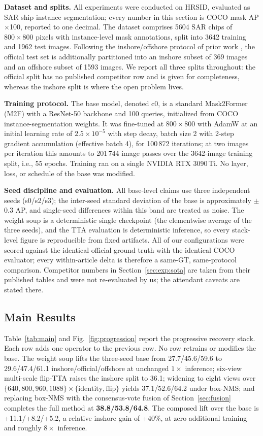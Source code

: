 \textbf{Dataset and splits.} All experiments were conducted on HRSID, evaluated as SAR ship instance segmentation; every number in this section is COCO mask AP $\times$100, reported to one decimal. The dataset comprises 5604 SAR chips of $800\times800$ pixels with instance-level mask annotations, split into 3642 training and 1962 test images. Following the inshore/offshore protocol of prior work \cite{o2former2025}, the official test set is additionally partitioned into an inshore subset of 369 images and an offshore subset of 1593 images. We report all three splits throughout: the official split has no published competitor row and is given for completeness, whereas the inshore split is where the open problem lives.

\textbf{Training protocol.} The base model, denoted c0, is a standard Mask2Former (M2F) \cite{mask2former2022} with a ResNet-50 backbone and 100 queries, initialized from COCO instance-segmentation weights. It was fine-tuned at $800\times800$ with AdamW at an initial learning rate of $2.5\times10^{-5}$ with step decay, batch size 2 with 2-step gradient accumulation (effective batch 4), for 100\,872 iterations; at two images per iteration this amounts to 201\,744 image passes over the 3642-image training split, i.e., 55 epochs. Training ran on a single NVIDIA RTX 3090\,Ti. No layer, loss, or schedule of the base was modified.

\textbf{Seed discipline and evaluation.} All base-level claims use three independent seeds (s0/s2/s3); the inter-seed standard deviation of the base is approximately $\pm$0.3 AP, and single-seed differences within this band are treated as noise. The weight soup is a deterministic single checkpoint (the elementwise average of the three seeds), and the TTA evaluation is deterministic inference, so every stack-level figure is reproducible from fixed artifacts. All of our configurations were scored against the identical official ground truth with the identical COCO evaluator; every within-article delta is therefore a same-GT, same-protocol comparison. Competitor numbers in Section~\ref{sec:exp:sota} are taken from their published tables and were not re-evaluated by us; the attendant caveats are stated there.

\subsection{Main Results}\label{sec:exp:main}

Table~\ref{tab:main} and Fig.~\ref{fig:progression} report the progressive recovery stack. Each row adds one operator to the previous row. No row retrains or modifies the base. The weight soup lifts the three-seed base from 27.7/45.6/59.6 to 29.6/47.4/61.1 inshore/official/offshore at unchanged $1\times$ inference; six-view multi-scale flip-TTA raises the inshore split to 36.1; widening to eight views over $\{640,800,960,1088\}\times\{\mathrm{identity},\mathrm{flip}\}$ yields 37.1/52.6/64.2 under box-NMS; and replacing box-NMS with the consensus-vote fusion of Section~\ref{sec:fusion} completes the full method at \textbf{38.8/53.8/64.8}. The composed lift over the base is +11.1/+8.2/+5.2, a relative inshore gain of +40\%, at zero additional training and roughly $8\times$ inference.

